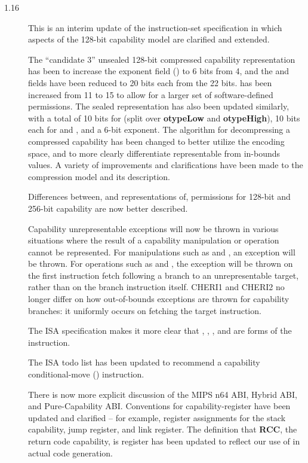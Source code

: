 \begin{description}
\item[1.16] This is an interim update of the instruction-set specification in
  which aspects of the 128-bit capability model are clarified and extended.

  The ``candidate 3'' unsealed 128-bit compressed capability representation
  has been to increase the exponent field (\cexponent{}) to 6 bits from 4, and
  the \cbasebits{} and \ctopbits{} fields have been reduced to 20 bits each
  from the 22 bits.
  \cperms{} has been increased from 11 to 15 to allow for a larger set of
  software-defined permissions.
  The sealed representation has also been updated similarly, with a total of
  10 bits for \cotype{} (split over {\bf otypeLow} and {\bf otypeHigh}), 10
  bits each for \cbasebits{} and \ctopbits{}, and a 6-bit exponent.
  The algorithm for decompressing a compressed capability has been changed to
  better utilize the encoding space, and to more clearly differentiate
  representable from in-bounds values.
  A variety of improvements and clarifications have been made to the
  compression model and its description.

  Differences between, and representations of, permissions for 128-bit and
  256-bit capability are now better described.

  Capability unrepresentable exceptions will now be thrown in various
  situations where the result of a capability manipulation or operation cannot
  be represented.
  For manipulations such as  and ,
  an exception will be thrown.
  For operations such as  and , the
  exception will be thrown on the first instruction fetch following a branch
  to an unrepresentable target, rather than on the branch instruction itself.
  CHERI1 and CHERI2 no longer differ on how out-of-bounds exceptions are
  thrown for capability branches: it uniformly occurs on fetching the target
  instruction.

  The ISA specification makes it more clear that ,
  , , and  are
  forms of the  instruction.

  The ISA todo list has been updated to recommend a capability
  conditional-move () instruction.

  There is now more explicit discussion of the MIPS n64 ABI, Hybrid ABI,
  and Pure-Capability ABI.
  Conventions for capability-register have been updated and clarified --
  for example, register assignments for the stack capability, jump register,
  and link register.
  The definition that {\bf RCC}, the return code capability, is register
   has been updated to reflect our use of  in actual code
  generation.


\end{description}
